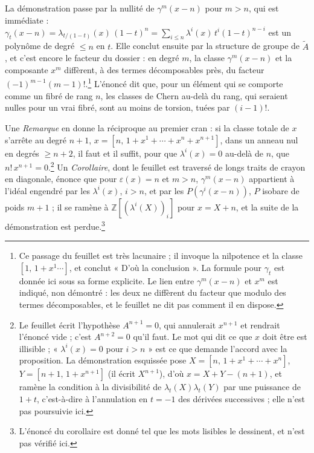\documentclass[11pt,a4paper]{article}
\begin{document}
La démonstration passe par la nullité de $\gamma^{m}(x - n)$ pour $m > n$, qui
est immédiate : $\gamma_{t}(x - n) = \lambda_{t/(1-t)}(x)\,(1-t)^{n} =
\sum_{i \leqslant n} \lambda^{i}(x)\, t^{i}(1-t)^{n-i}$ est un polynôme de degré
$\leqslant n$ en $t$. Elle conclut ensuite par la structure de groupe de
$\widetilde{A}$, et c'est encore le facteur du dossier : en degré $m$, la
classe $\gamma^{m}(x - n)$ et la composante $x^{m}$ diffèrent, à des termes
décomposables près, du facteur $(-1)^{m-1}(m-1)!$.\footnote{Ce passage du feuillet est très lacunaire ; il
invoque la nilpotence et la classe $[1,\, 1 + x^{1} \cdots]$, et conclut
« D'où la conclusion ». La formule pour $\gamma_{t}$ est donnée ici sous sa
forme explicite. Le lien entre $\gamma^{m}(x-n)$ et $x^{m}$ est indiqué, non
démontré : les deux ne diffèrent du facteur que modulo des termes décomposables,
et le feuillet ne dit pas comment il en dispose.} L'énoncé dit que, pour un
élément qui se comporte comme un fibré de rang $n$, les classes de Chern
au-delà du rang, qui seraient nulles pour un vrai fibré, sont au moins de
torsion, tuées par $(i-1)!$.

Une \emph{Remarque} en donne la réciproque au premier cran : si la classe
totale de $x$ s'arrête au degré $n+1$, $x = [n,\, 1 + x^{1} + \cdots + x^{n} +
x^{n+1}]$, dans un anneau nul en degrés $\geqslant n+2$, il faut et il suffit,
pour que $\lambda^{i}(x) = 0$ au-delà de $n$, que $n!\,x^{n+1} =
0$.\footnote{Le feuillet écrit l'hypothèse $A^{n+1} = 0$, qui annulerait
$x^{n+1}$ et rendrait l'énoncé vide ; c'est $A^{n+2} = 0$ qu'il faut. Le mot
qui dit ce que $x$ doit être est illisible ; « $\lambda^{i}(x) = 0$ pour
$i > n$ » est ce que demande l'accord avec la proposition. La démonstration
esquissée pose $X = [n,\, 1 + x^{1} + \cdots + x^{n}]$, $Y = [n+1,\, 1 +
x^{n+1}]$ (il écrit $X^{n+1}$), d'où $x = X + Y - (n+1)$, et ramène la condition à la divisibilité
de $\lambda_{t}(X)\lambda_{t}(Y)$ par une puissance de $1+t$, c'est-à-dire à
l'annulation en $t = -1$ des dérivées successives ; elle n'est pas poursuivie
ici.} Un \emph{Corollaire}, dont le feuillet est traversé de longs traits de
crayon en diagonale, énonce que pour $\varepsilon(x) = n$ et $m > n$,
$\gamma^{m}(x - n)$ appartient à l'idéal engendré par les $\lambda^{i}(x)$,
$i > n$, et par les $P(\gamma^{i}(x - n))$, $P$ isobare de poids $m+1$ ; il
se ramène à $\mathbb{Z}[(\lambda^{i}(X))_{i}]$ pour $x = X + n$, et la suite de
la démonstration est perdue.\footnote{L'énoncé du corollaire est donné tel
que les mots lisibles le dessinent, et n'est pas vérifié ici.}
\end{document}
